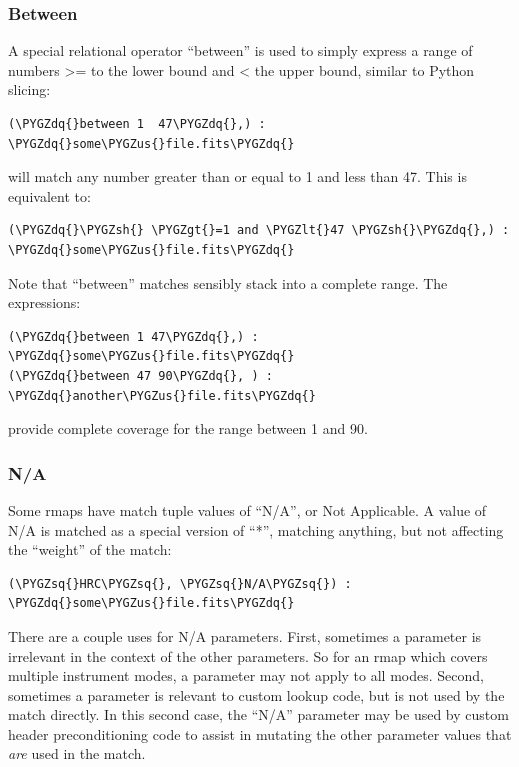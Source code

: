 \documentclass[letterpaper,10pt,english]{sphinxmanual}
\def\PYGZus{\char`\_}
\def\PYGZlt{\char`\<}
\def\PYGZgt{\char`\>}
\def\PYGZsh{\char`\#}
\def\PYGZsq{\char`\'}
\def\PYGZdq{\char`\"}
\renewcommand\PYGZsq{\textquotesingle}
\begin{document}
\subsubsection{Between}
\label{rmap_syntax:between}
A special relational operator ``between'' is used to simply express a range
of numbers \textgreater{}= to the lower bound and \textless{} the upper bound,  similar to Python
slicing:

\begin{Verbatim}[commandchars=\\\{\}]
(\PYGZdq{}between 1  47\PYGZdq{},) : \PYGZdq{}some\PYGZus{}file.fits\PYGZdq{}
\end{Verbatim}

will match any number greater than or equal to 1 and less than 47.   This is
equivalent to:

\begin{Verbatim}[commandchars=\\\{\}]
(\PYGZdq{}\PYGZsh{} \PYGZgt{}=1 and \PYGZlt{}47 \PYGZsh{}\PYGZdq{},) : \PYGZdq{}some\PYGZus{}file.fits\PYGZdq{}
\end{Verbatim}

Note that ``between'' matches sensibly stack into a complete range.  The expressions:

\begin{Verbatim}[commandchars=\\\{\}]
(\PYGZdq{}between 1 47\PYGZdq{},) : \PYGZdq{}some\PYGZus{}file.fits\PYGZdq{}
(\PYGZdq{}between 47 90\PYGZdq{}, ) : \PYGZdq{}another\PYGZus{}file.fits\PYGZdq{}
\end{Verbatim}

provide complete coverage for the range between 1 and 90.


\subsubsection{N/A}
\label{rmap_syntax:n-a}
Some rmaps have match tuple values of ``N/A'',  or Not Applicable.
A value of N/A is matched as a special version of ``*'', matching anything,  but
not affecting the ``weight'' of the match:

\begin{Verbatim}[commandchars=\\\{\}]
(\PYGZsq{}HRC\PYGZsq{}, \PYGZsq{}N/A\PYGZsq{}) :  \PYGZdq{}some\PYGZus{}file.fits\PYGZdq{}
\end{Verbatim}

There are a couple uses for N/A parameters.    First,  sometimes a parameter is
irrelevant in the context of the other parameters.   So for an rmap which covers
multiple instrument modes,  a parameter may not apply to all modes. Second,
sometimes a parameter is relevant to custom lookup code,  but is not used by the
match directly.  In this second case,   the ``N/A'' parameter may be used by custom
header preconditioning code to assist in mutating the other parameter values
that \emph{are} used in the match.
\end{document}

